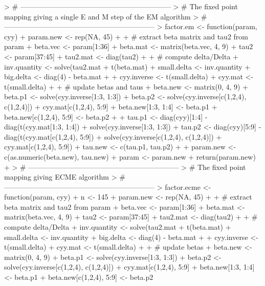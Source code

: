 \documentclass{article}
\begin{document}
\begin{Schunk}
\begin{Sinput}
> # ---------------------------------------------------------------
> # The fixed point mapping giving a single E and M step of the EM algorithm
> # ---------------------------------------------------------------
> factor.em <- function(param, cyy){
+   param.new <- rep(NA, 45)
+   
+   # extract beta matrix and tau2 from param
+   beta.vec <- param[1:36]
+   beta.mat <- matrix(beta.vec, 4, 9)
+   tau2 <- param[37:45]
+   tau2.mat <- diag(tau2)
+   
+   # compute delta/Delta
+   inv.quantity <- solve(tau2.mat + t(beta.mat) %*% beta.mat)
+   small.delta <- inv.quantity %*% t(beta.mat)
+   big.delta <- diag(4) - beta.mat %*% inv.quantity %*% t(beta.mat)
+   
+   cyy.inverse <- t(small.delta) %*% cyy %*% small.delta + big.delta
+   cyy.mat <- t(small.delta) %*% cyy
+   
+   # update betas and taus
+   beta.new <- matrix(0, 4, 9)
+   beta.p1 <- solve(cyy.inverse[1:3, 1:3]) %*% cyy.mat[1:3, 1:4]
+   beta.p2 <- solve(cyy.inverse[c(1,2,4), c(1,2,4)]) %*% 
+     cyy.mat[c(1,2,4), 5:9]
+   beta.new[1:3, 1:4] <- beta.p1
+   beta.new[c(1,2,4), 5:9] <- beta.p2
+   
+   tau.p1 <- diag(cyy)[1:4] - diag(t(cyy.mat[1:3, 1:4]) %*% 
+                                     solve(cyy.inverse[1:3, 1:3]) %*% cyy.mat[1:3, 1:4])
+   tau.p2 <- diag(cyy)[5:9] - diag(t(cyy.mat[c(1,2,4), 5:9]) %*% 
+                                     solve(cyy.inverse[c(1,2,4), c(1,2,4)]) %*% 
+                                     cyy.mat[c(1,2,4), 5:9])
+   tau.new <- c(tau.p1, tau.p2)
+   
+   param.new <- c(as.numeric(beta.new), tau.new)
+   param <- param.new
+   return(param.new)
+ }
> # ---------------------------------------------------------------
> # The fixed point mapping giving ECME algorithm
> # ---------------------------------------------------------------
> factor.ecme <- function(param, cyy){
+   n <- 145
+   param.new <- rep(NA, 45)
+   
+   # extract beta matrix and tau2 from param
+   beta.vec <- param[1:36]
+   beta.mat <- matrix(beta.vec, 4, 9)
+   tau2 <- param[37:45]
+   tau2.mat <- diag(tau2)
+   
+   # compute delta/Delta
+   inv.quantity <- solve(tau2.mat + t(beta.mat) %*% beta.mat)
+   small.delta <- inv.quantity %*% t(beta.mat)
+   big.delta <- diag(4) - beta.mat %*% inv.quantity %*% t(beta.mat)
+   
+   cyy.inverse <- t(small.delta) %*% cyy %*% small.delta + big.delta
+   cyy.mat <- t(small.delta) %*% cyy
+   
+   # update betas
+   beta.new <- matrix(0, 4, 9)
+   beta.p1 <- solve(cyy.inverse[1:3, 1:3]) %*% cyy.mat[1:3, 1:4]
+   beta.p2 <- solve(cyy.inverse[c(1,2,4), c(1,2,4)]) %*% 
+     cyy.mat[c(1,2,4), 5:9]
+   beta.new[1:3, 1:4] <- beta.p1
+   beta.new[c(1,2,4), 5:9] <- beta.p2
}
\end{Sinput}
\end{Schunk}
\end{document}
